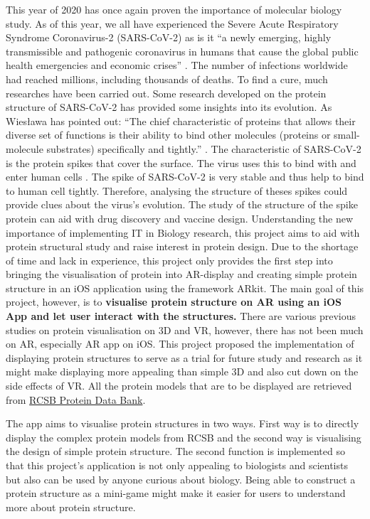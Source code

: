 This year of 2020 has once again proven the importance of molecular biology study. As of this year, we all have experienced the Severe Acute Respiratory Syndrome Coronavirus-2 (SARS-CoV-2) as is it ``a newly emerging, highly transmissible and pathogenic coronavirus in humans that cause the global public health emergencies and economic crises'' \parencite{mittal_covid-19_2020}. The number of infections worldwide had reached millions, including thousands of deaths. To find a cure, much researches have been carried out. Some research developed on the protein structure of SARS-CoV-2 has provided some insights into its evolution. As Wiesława has pointed out: ``The chief characteristic of proteins that allows their diverse set of functions is their ability to bind other molecules (proteins or small-molecule substrates) specifically and tightly.'' \parencite{hutchison_protein_2013}. The characteristic of SARS-CoV-2 is the protein spikes that cover the surface. The virus uses this to bind with and enter human cells \parencite{wrobel_sars-cov-2_2020}. The spike of SARS-CoV-2 is very stable and thus help to bind to human cell tightly. Therefore, analysing the structure of theses spikes could provide clues about the virus’s evolution. The study of the structure of the spike protein can aid with drug discovery and vaccine design. 
Understanding the new importance of implementing IT in Biology research, this project aims to aid with protein structural study and raise interest in protein design.
Due to the shortage of time and lack in experience, this project only provides the first step into bringing the visualisation of protein into AR-display and creating simple protein structure in an iOS application using the framework ARkit. The main goal of this project, however, is to \textbf{visualise protein structure on AR using an iOS App and let user interact with the structures.} 
There are various previous studies on protein visualisation on 3D and VR, however, there has not been much on AR, especially AR app on iOS. This project proposed the implementation of displaying protein structures to serve as a trial for future study and research as it might make displaying more appealing than simple 3D and also cut down on the side effects of VR. All the protein models that are to be displayed are retrieved from \href{https://www.rcsb.org/}{RCSB Protein Data Bank}. 

The app aims to visualise protein structures in two ways. First way is to directly display the complex protein models from RCSB and the second way is visualising the design of simple protein structure. The second function is implemented so that this project's application is not only appealing to biologists and scientists but also can be used by anyone curious about biology. Being able to construct a protein structure as a mini-game might make it easier for users to understand more about protein structure. 

